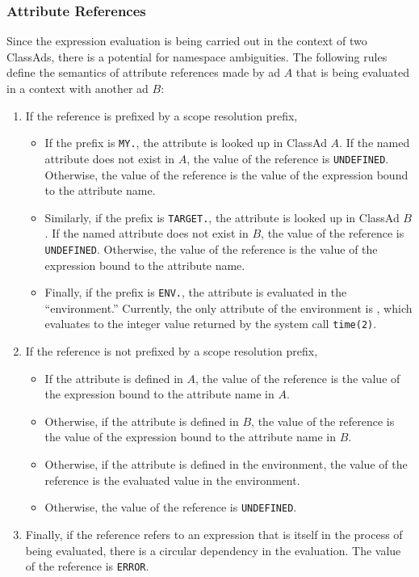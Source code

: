 \subsubsection{Attribute References}
Since the expression evaluation is being carried out in the context of two
ClassAds, there is a potential for namespace ambiguities.  The following
rules define the semantics of attribute references made by ad $A$ that is being 
evaluated in a context with another ad $B$:
\begin{enumerate}
	\item If the reference is prefixed by a scope resolution prefix, 
	\begin{itemize}
		\item If the prefix is \texttt{MY.}, the attribute is looked up in 
			ClassAd $A$.  If the named attribute does not exist in $A$, the
			value of the reference is \texttt{UNDEFINED}.  Otherwise, the
			value of the reference is the value of the expression bound to
			the attribute name.

		\item Similarly, if the prefix is \texttt{TARGET.}, the attribute is 
			looked up in ClassAd $B$.  If the named attribute does not exist in 
			$B$, the value of the reference is \texttt{UNDEFINED}.  Otherwise, 
			the value of the reference is the value of the expression bound to
			the attribute name.

		\item Finally, if the prefix is \texttt{ENV.}, the attribute is
			evaluated in the ``environment.''  Currently, the only attribute
			of the environment is , which evaluates to the
			integer value returned by the system call \texttt{time(2)}.
	\end{itemize}

	\item If the reference is not prefixed by a scope resolution prefix,
	\begin{itemize}
		\item If the attribute is defined in $A$, the value of the reference
			is the value of the expression bound to the attribute name in $A$.
		\item Otherwise, if the attribute is defined in $B$, the value of the
			reference is the value of the expression bound to the attribute
			name in $B$.
		\item Otherwise, if the attribute is defined in the environment, the
			value of the reference is the evaluated value in the environment.
		\item Otherwise, the value of the reference is \texttt{UNDEFINED}.
	\end{itemize}

	\item Finally, if the reference refers to an expression that is itself in 
	the process of being evaluated, there is a circular dependency in the 
	evaluation.  The value of the reference is \texttt{ERROR}.
\end{enumerate}

